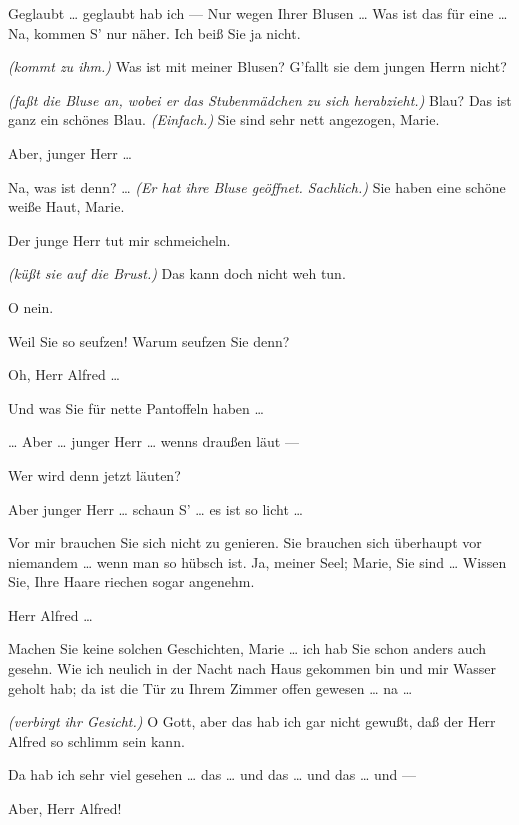 \documentclass[
	final,
	a4paper,
	ngerman,
	mpinclude = true, %
	twoside = true,
	open = right,
	cleardoublepage = plain,
	DIV = 13,
	BCOR = 1cm,
	titlepage = firstiscover,
	]{scrbook}
\newcommand{\direction}[1]{\textit{(#1)}}
\newcommand{\thecharacter}[1]{\textup{\textsc{#1}}\xspace}
\newcommand{\themaedchen}{\thecharacter{Praktikant}}
\newcommand{\theherr}{\thecharacter{Junger Herr}}
\newcommand{\character}[1]{\item[#1:]}
\newcommand{\maedchen}{\character{\themaedchen}}
\newcommand{\herr}{\character{\theherr}}
\begin{document}
\begin{play}
	\herr
	Geglaubt \ldots{} geglaubt hab ich --- Nur wegen Ihrer Blusen \ldots{} Was ist das für eine \ldots{} Na, kommen S' nur näher. Ich beiß Sie ja nicht.

	\maedchen
	\direction{kommt zu ihm.} Was ist mit meiner Blusen? G'fallt sie dem jungen Herrn nicht?

	\herr
	\direction{faßt die Bluse an, wobei er das Stubenmädchen zu sich herabzieht.} Blau? Das ist ganz ein schönes Blau. \direction{Einfach.} Sie sind sehr nett angezogen, Marie.

	\maedchen
	Aber, junger Herr \ldots{}

	\herr
	Na, was ist denn? \ldots{} \direction{Er hat ihre Bluse geöffnet. Sachlich.} Sie haben eine schöne weiße Haut, Marie.

	\maedchen
	Der junge Herr tut mir schmeicheln.

	\herr
	\direction{küßt sie auf die Brust.} Das kann doch nicht weh tun.

	\maedchen
	O nein.

	\herr
	Weil Sie so seufzen! Warum seufzen Sie denn?

	\maedchen
	Oh, Herr Alfred \ldots{}

	\herr
	Und was Sie für nette Pantoffeln haben \ldots{}

	\maedchen
	\ldots{} Aber \ldots{} junger Herr \ldots{} wenns draußen läut ---

	\herr
	Wer wird denn jetzt läuten?

	\maedchen
	Aber junger Herr \ldots{} schaun S' \ldots{} es ist so licht \ldots{}

	\herr
	Vor mir brauchen Sie sich nicht zu genieren. Sie brauchen sich überhaupt vor niemandem \ldots{} wenn man so hübsch ist. Ja, meiner Seel; Marie, Sie sind \ldots{} Wissen Sie, Ihre Haare riechen sogar angenehm.

	\maedchen
	Herr Alfred \ldots{}

	\herr
	Machen Sie keine solchen Geschichten, Marie \ldots{} ich hab Sie schon anders auch gesehn. Wie ich neulich in der Nacht nach Haus gekommen bin und mir Wasser geholt hab; da ist die Tür zu Ihrem Zimmer offen gewesen \ldots{} na \ldots{}

	\maedchen
	\direction{verbirgt ihr Gesicht.} O Gott, aber das hab ich gar nicht gewußt, daß der Herr Alfred so schlimm sein kann.

	\herr
	Da hab ich sehr viel gesehen \ldots{} das \ldots{} und das \ldots{} und das \ldots{} und ---

	\maedchen
	Aber, Herr Alfred!


\end{play}
\end{document}
